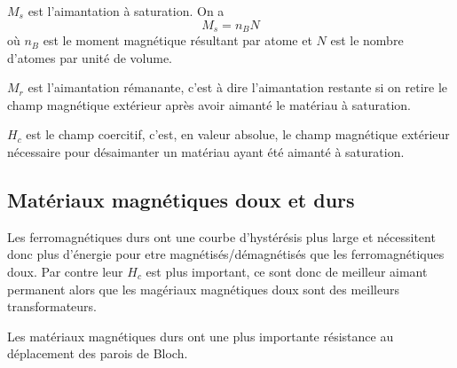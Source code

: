 $M_s$ est l'aimantation à saturation.
On a
\[ M_s = n_B N \]
où $n_B$ est le moment magnétique résultant par atome et $N$ est le nombre d'atomes par unité de volume.

$M_r$ est l'aimantation rémanante, c'est à dire l'aimantation restante si on retire le champ magnétique extérieur après avoir aimanté le matériau à saturation.

$H_c$ est le champ coercitif, c'est, en valeur absolue, le champ magnétique extérieur nécessaire pour désaimanter un matériau ayant été aimanté à saturation.

\subsection{Matériaux magnétiques doux et durs}
Les ferromagnétiques durs ont une courbe d'hystérésis plus large et nécessitent donc plus d'énergie pour etre magnétisés/démagnétisés que les ferromagnétiques doux.
Par contre leur $H_c$ est plus important, ce sont donc de meilleur aimant permanent alors que les magériaux magnétiques doux sont des meilleurs transformateurs.

Les matériaux magnétiques durs ont une plus importante résistance au déplacement des parois de Bloch.

